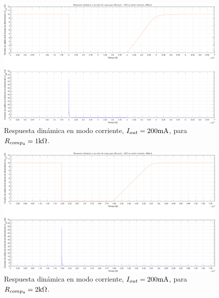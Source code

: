 \clearpage

\begin{figure}[H] %
\begin{center}
\includegraphics[width=1.1 \textwidth, angle=90]{./img/plots/dynamic/power_supply_RCOMP4_1k_STEP_Modo4.png}
\caption{\label{fig:fig_power_supply_RCOMP4_STEP_1k_Modo4}\footnotesize{Respuesta dinámica en modo corriente, $I_{out} = 200 \si[per-mode=symbol]{\milli\ampere}$, para $R_{comp_{4}} = 1 \si[per-mode=symbol]{\kilo\ohm} $.}}
\end{center}
\end{figure}

\clearpage

\begin{figure}[H] %
\begin{center}
\includegraphics[width=1.1 \textwidth, angle=90]{./img/plots/dynamic/power_supply_RCOMP4_2k_STEP_Modo4.png}
\caption{\label{fig:fig_power_supply_RCOMP4_STEP_2k_Modo4}\footnotesize{Respuesta dinámica en modo corriente, $I_{out} = 200 \si[per-mode=symbol]{\milli\ampere}$, para $R_{comp_{4}} = 2 \si[per-mode=symbol]{\kilo\ohm} $.}}
\end{center}
\end{figure}

\clearpage




